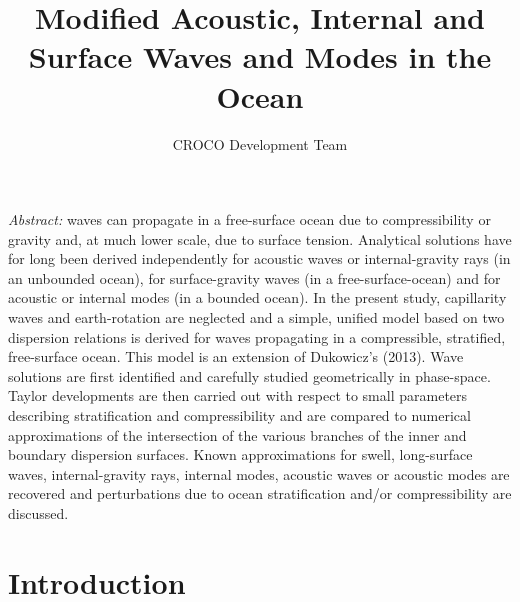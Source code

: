 \documentclass[a4paper,11pt]{article}
\title{Modified Acoustic, Internal and Surface Waves and Modes in the Ocean}
\author{CROCO Development Team}
\begin{document}
\renewcommand{\thepage}{}
\hypersetup{pdfborder=0 0 0}
\maketitle
\setcounter{tocdepth}{2}

\let\oldref\ref
\renewcommand{\ref}[1]{(\oldref{#1})}


\textit{Abstract:} waves can propagate in a free-surface ocean due to compressibility or gravity and, at much lower scale, due to surface tension. Analytical solutions have for long been derived independently for acoustic waves or internal-gravity rays (in an unbounded ocean), for surface-gravity waves (in a free-surface-ocean) and for acoustic or internal modes (in a bounded ocean). In the present study, capillarity waves and earth-rotation are neglected and a simple, unified model based on two dispersion relations is derived for waves propagating in a compressible, stratified, free-surface ocean. This model is an extension of Dukowicz's (2013). Wave solutions are first identified and carefully studied geometrically in phase-space. Taylor developments are then carried out with respect to small parameters describing stratification and compressibility and are compared to numerical approximations of the intersection of the various branches of the inner and boundary dispersion surfaces. Known approximations for swell, long-surface waves, internal-gravity rays, internal modes, acoustic waves or acoustic modes are recovered and perturbations due to ocean stratification and/or compressibility are discussed.\\

\newpage
\renewcommand{\thepage}{\arabic{page}}
\setcounter{page}{1}
\section{Introduction}
\end{document}
